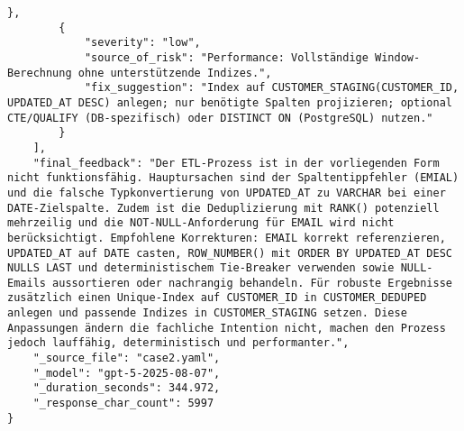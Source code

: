 \begin{lstlisting}[caption={Ausgabe: GPT-5 Anwendungsfall 2 Robustheitsdurchlauf},label={gpt_case2_prompt3}]
        },
        {
            "severity": "low",
            "source_of_risk": "Performance: Vollständige Window-Berechnung ohne unterstützende Indizes.",
            "fix_suggestion": "Index auf CUSTOMER_STAGING(CUSTOMER_ID, UPDATED_AT DESC) anlegen; nur benötigte Spalten projizieren; optional CTE/QUALIFY (DB-spezifisch) oder DISTINCT ON (PostgreSQL) nutzen."
        }
    ],
    "final_feedback": "Der ETL-Prozess ist in der vorliegenden Form nicht funktionsfähig. Hauptursachen sind der Spaltentippfehler (EMIAL) und die falsche Typkonvertierung von UPDATED_AT zu VARCHAR bei einer DATE-Zielspalte. Zudem ist die Deduplizierung mit RANK() potenziell mehrzeilig und die NOT-NULL-Anforderung für EMAIL wird nicht berücksichtigt. Empfohlene Korrekturen: EMAIL korrekt referenzieren, UPDATED_AT auf DATE casten, ROW_NUMBER() mit ORDER BY UPDATED_AT DESC NULLS LAST und deterministischem Tie-Breaker verwenden sowie NULL-Emails aussortieren oder nachrangig behandeln. Für robuste Ergebnisse zusätzlich einen Unique-Index auf CUSTOMER_ID in CUSTOMER_DEDUPED anlegen und passende Indizes in CUSTOMER_STAGING setzen. Diese Anpassungen ändern die fachliche Intention nicht, machen den Prozess jedoch lauffähig, deterministisch und performanter.",
    "_source_file": "case2.yaml",
    "_model": "gpt-5-2025-08-07",
    "_duration_seconds": 344.972,
    "_response_char_count": 5997
}
\end{lstlisting}

